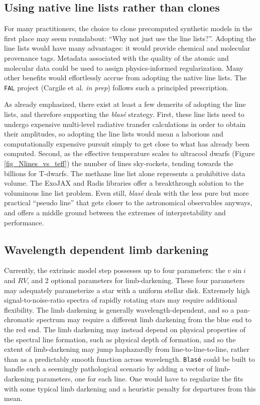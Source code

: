 \documentclass[twocolumn]{aastex631}
\begin{document}
\subsection{Using native line lists rather than clones}
For many practitioners, the choice to clone precomputed synthetic models in the first place may seem roundabout: ``Why not just use the line lists?''. Adopting the line lists would have many advantages: it would provide chemical and molecular provenance tags. Metadata associated with the quality of the atomic and molecular data could be used to assign physics-informed regularization. Many other benefits would effortlessly accrue from adopting the native line lists. The \texttt{FAL} project (Cargile et al. \emph{in prep}) follows such a principled prescription.

As already emphasized, there exist at least a few demerits of adopting the line lists, and therefore supporting the \emph{blas\'e} strategy. First, these line lists need to undergo expensive multi-level radiative transfer calculations in order to obtain their amplitudes, so adopting the line lists would mean a laborious and computationally expensive pursuit simply to get close to what has already been computed. Second, as the effective temperature scales to ultracool dwarfs (Figure \ref{fig_Nlines_vs_teff}) the number of lines sky-rockets, tending towards the billions for T-dwarfs. The methane line list alone \citep{2020ApJS..247...55H} represents a prohibitive data volume. The ExoJAX and Radis \citep{2019JQSRT.222...12P,2021JQSRT.26107476V} libraries offer a breakthrough solution to the voluminous line list problem. Even still, \emph{blas\'e} deals with the less pure but more practical ``pseudo line'' that gets closer to the astronomical observables anyways, and offers a middle ground between the extremes of interpretability and performance.

\subsection{Wavelength dependent limb darkening}
Currently, the extrinsic model step possesses up to four parameters: the $v\sin{i}$ and $RV$, and 2 optional parameters for limb-darkening. These four parameters may adequately parameterize a star with a uniform stellar disk. Extremely high signal-to-noise-ratio spectra of rapidly rotating stars may require additional flexibility. The limb darkening is generally wavelength-dependent, and so a pan-chromatic spectrum may require a different limb darkening from the blue end to the red end. The limb darkening may instead depend on physical properties of the spectral line formation, such as physical depth of formation, and so the extent of limb-darkening may jump haphazardly from line-to-line-to-line, rather than as a predictably smooth function across wavelength. \texttt{Blas\'e} could be built to handle such a seemingly pathological scenario by adding a vector of limb-darkening parameters, one for each line. One would have to regularize the fits with some typical limb darkening and a heuristic penalty for departures from this mean.
\end{document}
